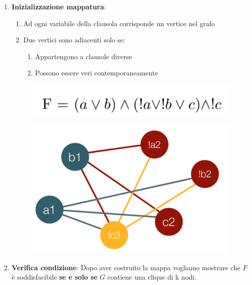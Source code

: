 \documentclass{article}
\begin{document}
\begin{enumerate}
    \item \textbf{Inizializzazione mappatura}:
    \begin{enumerate}
        \item Ad ogni variabile della clausola corrisponde un vertice nel grafo
        \item Due vertici sono adiacenti solo se:
        \begin{enumerate}
            \item Appartengono a clausole diverse
            \item Possono essere veri contemporaneamente
        \end{enumerate}
    \end{enumerate}

    \begin{figure}[htbp]
        \center
        \includegraphics[scale=0.3]{img/map1.png}
    \end{figure}
    
    \begin{figure}[htbp]
        \center
        \includegraphics[scale=0.35]{img/map2.png}
    \end{figure}
    
    \item \textbf{Verifica condizione}: Dopo aver costruito la mappa vogliamo mostrare che $F$ è soddisfacibile \textbf{se e solo se} $G$ contiene una clique di k nodi.


\end{enumerate}
\end{document}
